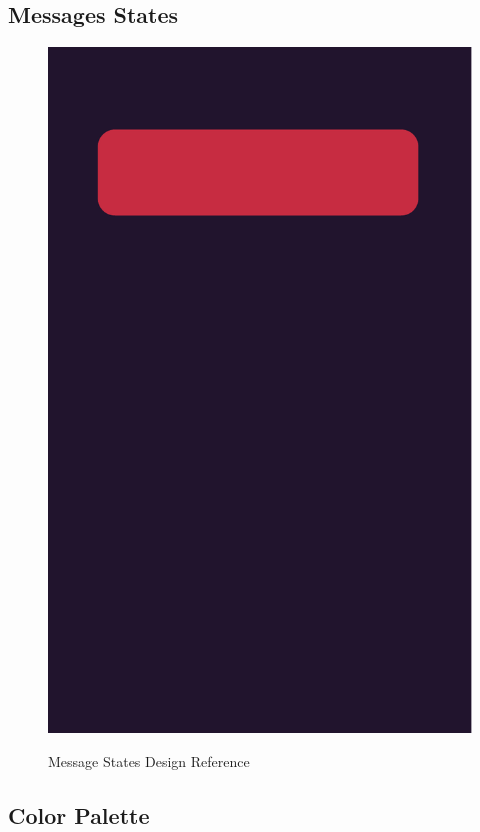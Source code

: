 \subsection{Messages States}\label{subsec:messages-states}
\begin{figure}[ht]
    \caption{Message States Design Reference}
    \includegraphics[width=1.0\textwidth]{./graphics/message-states}\label{fig:figure3}
\end{figure}

\subsection{Color Palette}\label{subsec:color-palette}


